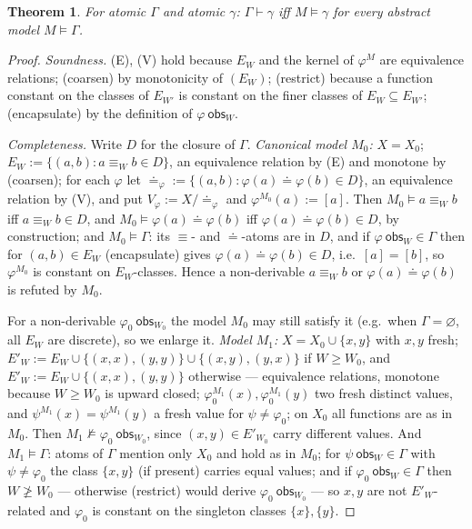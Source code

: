 \documentclass[11pt]{amsart}
\newtheorem{thm}{Theorem}[section]
\theoremstyle{definition}
\newcommand{\obs}{\ \mathsf{obs}}
\begin{document}
\begin{thm}\label{thm:complete}
For atomic $\Gamma$ and atomic $\gamma$: $\Gamma\vdash\gamma$ iff
$M\models\gamma$ for every abstract model $M\models\Gamma$.
\end{thm}
\begin{proof}
\emph{Soundness.} (E), (V) hold because $E_W$ and the kernel of $\varphi^M$
are equivalence relations; (coarsen) by monotonicity of $(E_W)$; (restrict)
because a function constant on the classes of $E_{W'}$ is constant on the finer
classes of $E_W\subseteq E_{W'}$; (encapsulate) by the definition of
$\varphi\obs_W$.

\emph{Completeness.} Write $D$ for the closure of $\Gamma$. \emph{Canonical
model $M_0$:} $X=X_0$; $E_W:=\{(a,b):a\equiv_Wb\in D\}$, an equivalence relation
by (E) and monotone by (coarsen); for each $\varphi$ let $\doteq_\varphi:=
\{(a,b):\varphi(a)\doteq\varphi(b)\in D\}$, an equivalence relation by (V), and
put $V_\varphi:=X/{\doteq_\varphi}$ and $\varphi^{M_0}(a):=[a]$. Then
$M_0\models a\equiv_Wb$ iff $a\equiv_Wb\in D$, and $M_0\models\varphi(a)\doteq
\varphi(b)$ iff $\varphi(a)\doteq\varphi(b)\in D$, by construction; and
$M_0\models\Gamma$: its $\equiv$- and $\doteq$-atoms are in $D$, and if
$\varphi\obs_W\in\Gamma$ then for $(a,b)\in E_W$ (encapsulate) gives
$\varphi(a)\doteq\varphi(b)\in D$, i.e.\ $[a]=[b]$, so $\varphi^{M_0}$ is
constant on $E_W$-classes. Hence a non-derivable $a\equiv_Wb$ or
$\varphi(a)\doteq\varphi(b)$ is refuted by $M_0$.

For a non-derivable $\varphi_0\obs_{W_0}$ the model $M_0$ may still satisfy it
(e.g.\ when $\Gamma=\varnothing$, all $E_W$ are discrete), so we enlarge it.
\emph{Model $M_1$:} $X=X_0\cup\{x,y\}$ with $x,y$ fresh; $E'_W:=E_W\cup\{(x,x),
(y,y)\}\cup\{(x,y),(y,x)\}$ if $W\ge W_0$, and $E'_W:=E_W\cup\{(x,x),(y,y)\}$
otherwise --- equivalence relations, monotone because $W\ge W_0$ is upward
closed; $\varphi_0^{M_1}(x),\varphi_0^{M_1}(y)$ two fresh distinct values, and
$\psi^{M_1}(x)=\psi^{M_1}(y)$ a fresh value for $\psi\ne\varphi_0$; on $X_0$ all
functions are as in $M_0$. Then $M_1\not\models\varphi_0\obs_{W_0}$, since
$(x,y)\in E'_{W_0}$ carry different values. And $M_1\models\Gamma$: atoms of
$\Gamma$ mention only $X_0$ and hold as in $M_0$; for $\psi\obs_W\in\Gamma$ with
$\psi\ne\varphi_0$ the class $\{x,y\}$ (if present) carries equal values; and if
$\varphi_0\obs_W\in\Gamma$ then $W\not\ge W_0$ --- otherwise (restrict) would
derive $\varphi_0\obs_{W_0}$ --- so $x,y$ are not $E'_W$-related and $\varphi_0$
is constant on the singleton classes $\{x\},\{y\}$.
\end{proof}
\end{document}
